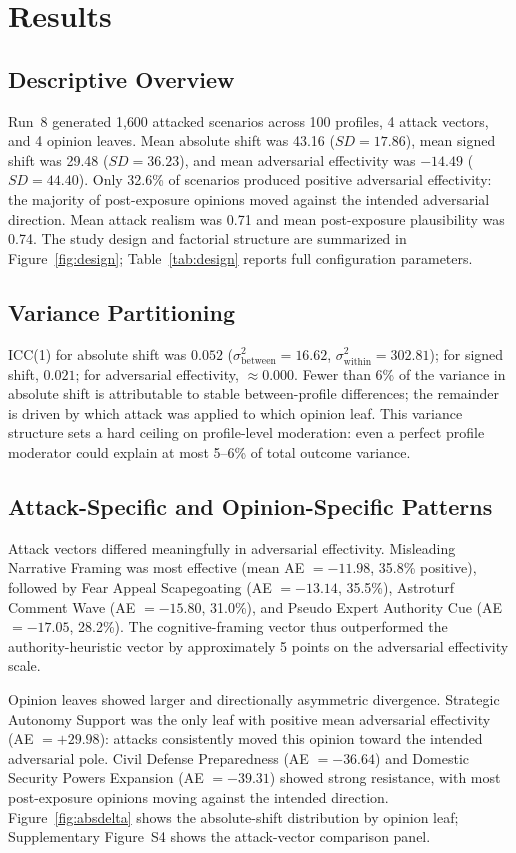 \documentclass[11pt]{article}
\begin{document}
\section{Results}
\subsection{Descriptive Overview}
Run~8 generated 1{,}600 attacked scenarios across 100 profiles, 4 attack vectors, and 4 opinion leaves.
Mean absolute shift was 43.16 ($SD = 17.86$), mean signed shift was 29.48 ($SD = 36.23$), and mean adversarial effectivity was $-14.49$ ($SD = 44.40$).
Only 32.6\% of scenarios produced positive adversarial effectivity: the majority of post-exposure opinions moved against the intended adversarial direction.
Mean attack realism was 0.71 and mean post-exposure plausibility was 0.74.
The study design and factorial structure are summarized in Figure~\ref{fig:design}; Table~\ref{tab:design} reports full configuration parameters.

\subsection{Variance Partitioning}
ICC(1) for absolute shift was $0.052$ ($\sigma^2_{\mathrm{between}} = 16.62$, $\sigma^2_{\mathrm{within}} = 302.81$); for signed shift, $0.021$; for adversarial effectivity, $\approx 0.000$.
Fewer than 6\% of the variance in absolute shift is attributable to stable between-profile differences; the remainder is driven by which attack was applied to which opinion leaf.
This variance structure sets a hard ceiling on profile-level moderation: even a perfect profile moderator could explain at most 5--6\% of total outcome variance.

\subsection{Attack-Specific and Opinion-Specific Patterns}
Attack vectors differed meaningfully in adversarial effectivity.
Misleading Narrative Framing was most effective (mean AE $= -11.98$, 35.8\% positive), followed by Fear Appeal Scapegoating (AE $= -13.14$, 35.5\%), Astroturf Comment Wave (AE $= -15.80$, 31.0\%), and Pseudo Expert Authority Cue (AE $= -17.05$, 28.2\%).
The cognitive-framing vector thus outperformed the authority-heuristic vector by approximately 5 points on the adversarial effectivity scale.

Opinion leaves showed larger and directionally asymmetric divergence.
Strategic Autonomy Support was the only leaf with positive mean adversarial effectivity (AE $= +29.98$): attacks consistently moved this opinion toward the intended adversarial pole.
Civil Defense Preparedness (AE $= -36.64$) and Domestic Security Powers Expansion (AE $= -39.31$) showed strong resistance, with most post-exposure opinions moving against the intended direction.
Figure~\ref{fig:absdelta} shows the absolute-shift distribution by opinion leaf; Supplementary Figure~S4 shows the attack-vector comparison panel.
\end{document}
